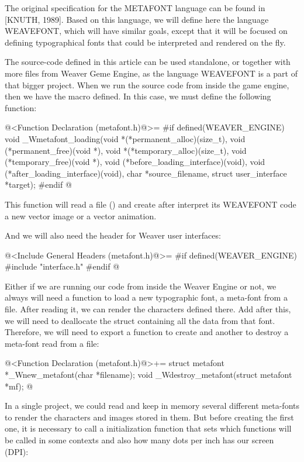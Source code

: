 The original specification for the METAFONT language can be found in
[KNUTH, 1989]. Based on this language, we will define here the
language WEAVEFONT, which will have similar goals, except that it will
be focused on defining typographical fonts that could be interpreted
and rendered on the fly.

The source-code defined in this article can be used standalone, or
together with more files from Weaver Geme Engine, as the language
WEAVEFONT is a part of that bigger project. When we run the source
code from inside the game engine, then we have the
macro  defined. In this case, we must define
the following function:

\iniciocodigo
@<Function Declaration (metafont.h)@>=
#if defined(WEAVER_ENGINE)
void _Wmetafont_loading(void *(*permanent_alloc)(size_t),
		      void (*permanent_free)(void *),
		      void *(*temporary_alloc)(size_t),
		      void (*temporary_free)(void *),
		      void (*before_loading_interface)(void),
		      void (*after_loading_interface)(void),
		      char *source_filename,
                      struct user_interface *target);
#endif
@
\fimcodigo

This function will read a file () and
create after interpret its WEAVEFONT code a new vector image or a
vector animation.

And we will also need the header for Weaver user interfaces:

\iniciocodigo
@<Include General Headers (metafont.h)@>=
#if defined(WEAVER_ENGINE)
#include "interface.h"
#endif
@
\fimcodigo

Either if we are running our code from inside the Weaver Engine or
not, we always will need a function to load a new typographic font, a
meta-font from a file. After reading it, we can render the characters
defined there. Add after this, we will need to deallocate the struct
containing all the data from that font. Therefore, we will need to
export a function to create and another to destroy a meta-font read
from a file:

\iniciocodigo
@<Function Declaration (metafont.h)@>+=
struct metafont *_Wnew_metafont(char *filename);
void _Wdestroy_metafont(struct metafont *mf);
@
\fimcodigo

In a single project, we could read and keep in memory several
different meta-fonts to render the characters and images stored in
them. But before creating the first one, it is necessary to call a
initialization function that sets which functions will be called in
some contexts and also how many dots per inch has our screen (DPI):

